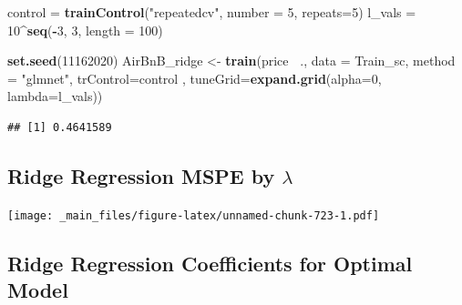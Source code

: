 \documentclass[]{book}
\newenvironment{Shaded}{\begin{snugshade}}{\end{snugshade}}
\newcommand{\KeywordTok}[1]{\textcolor[rgb]{0.13,0.29,0.53}{\textbf{#1}}}
\newcommand{\DataTypeTok}[1]{\textcolor[rgb]{0.13,0.29,0.53}{#1}}
\newcommand{\DecValTok}[1]{\textcolor[rgb]{0.00,0.00,0.81}{#1}}
\newcommand{\StringTok}[1]{\textcolor[rgb]{0.31,0.60,0.02}{#1}}
\newcommand{\OperatorTok}[1]{\textcolor[rgb]{0.81,0.36,0.00}{\textbf{#1}}}
\newcommand{\NormalTok}[1]{#1}
\begin{document}
\begin{Shaded}
\begin{Highlighting}[]
\NormalTok{control =}\StringTok{ }\KeywordTok{trainControl}\NormalTok{(}\StringTok{"repeatedcv"}\NormalTok{, }\DataTypeTok{number =} \DecValTok{5}\NormalTok{, }\DataTypeTok{repeats=}\DecValTok{5}\NormalTok{)}
\NormalTok{l_vals =}\StringTok{ }\DecValTok{10}\OperatorTok{^}\KeywordTok{seq}\NormalTok{(}\OperatorTok{-}\DecValTok{3}\NormalTok{, }\DecValTok{3}\NormalTok{, }\DataTypeTok{length =} \DecValTok{100}\NormalTok{)}

\KeywordTok{set.seed}\NormalTok{(}\DecValTok{11162020}\NormalTok{)}
\NormalTok{AirBnB_ridge <-}\StringTok{ }\KeywordTok{train}\NormalTok{(price }\OperatorTok{~}\NormalTok{., }\DataTypeTok{data =}\NormalTok{ Train_sc, }\DataTypeTok{method =} \StringTok{"glmnet"}\NormalTok{, }\DataTypeTok{trControl=}\NormalTok{control , }
                      \DataTypeTok{tuneGrid=}\KeywordTok{expand.grid}\NormalTok{(}\DataTypeTok{alpha=}\DecValTok{0}\NormalTok{, }\DataTypeTok{lambda=}\NormalTok{l_vals))}
\end{Highlighting}
\end{Shaded}

\begin{Shaded}
\end{Shaded}

\begin{verbatim}
## [1] 0.4641589
\end{verbatim}

\subsection{\texorpdfstring{Ridge Regression MSPE by
\(\lambda\)}{Ridge Regression MSPE by \textbackslash{}lambda}}\label{ridge-regression-mspe-by-lambda}

\texttt{[image: \_main\_files/figure-latex/unnamed-chunk-723-1.pdf]}

\subsection{Ridge Regression Coefficients for Optimal
Model}\label{ridge-regression-coefficients-for-optimal-model}

\begin{Shaded}
\end{Shaded}
\end{document}

